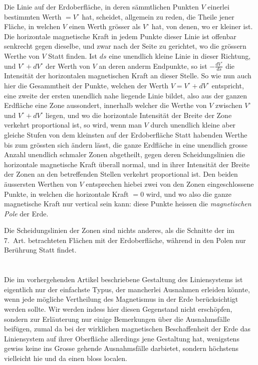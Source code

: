 \documentclass[fontsize=11pt,paper=a4,twoside,openany]{scrbook}
\begin{document}
Die Linie auf der Erdoberfläche, in deren sämmtlichen Punkten $V$ einerlei bestimmten Werth $=V^{\circ}$ hat, scheidet, allgemein zu reden, die Theile jener Fläche, in welchen $V$ einen Werth grösser als $V^{\circ}$ hat, von denen, wo er kleiner ist. Die horizontale magnetische Kraft in jedem Punkte dieser Linie ist offenbar senkrecht gegen dieselbe, und zwar nach der Seite zu gerichtet, wo die grössern Werthe von $V$ Statt finden. Ist $ds$ eine unendlich kleine Linie in dieser Richtung, und $V^{\circ}+dV^{\circ}$ der Werth von $V$ an deren anderm Endpunkte, so ist $-\frac{dV^{\circ}}{ds}$ die Intensität der horizontalen magnetischen Kraft an dieser Stelle. So wie nun auch hier die Gesammtheit der Punkte, welchen der Werth $V=V^{\circ}+dV^{\circ}$ entspricht, eine zweite der ersten unendlich nahe liegende Linie bildet, also aus der ganzen Erdfläche eine Zone aussondert, innerhalb welcher die Werthe von $V$ zwischen $V^{\circ}$ und $V^{\circ}+dV^{\circ}$ liegen, und wo die horizontale Intensität der Breite der Zone verkehrt proportional ist, so wird, wenn man $V$ durch unendlich kleine aber gleiche Stufen von dem kleinsten auf der Erdoberfläche Statt habenden Werthe bis zum grössten sich ändern lässt, die ganze Erdfläche in eine unendlich grosse Anzahl unendlich schmaler Zonen abgetheilt, gegen deren Scheidungslinien die horizontale magnetische Kraft überall normal, und in ihrer Intensität der Breite der Zonen an den betreffenden Stellen verkehrt proportional ist. Den beiden äussersten Werthen von $V$ entsprechen hiebei zwei von den Zonen eingeschlossene Punkte, in welchen die horizontale Kraft $=0$ wird, und wo also die ganze magnetische Kraft nur vertical sein kann: diese Punkte heissen die \textit{magnetischen Pole} der Erde.

Die Scheidungslinien der Zonen sind nichts anderes, als die Schnitte der im 7.~Art. betrachteten Flächen mit der Erdoberfläche, während in den Polen nur Berührung Statt findet.

\section{}

Die im vorhergehenden Artikel beschriebene Gestaltung des Liniensystems ist eigentlich nur der einfachste Typus, der mancherlei Ausnahmen erleiden könnte, wenn jede mögliche Vertheilung des Magnetismus in der Erde berücksichtigt werden sollte. Wir werden indess hier diesen Gegenstand nicht erschöpfen, sondern zur Erläuterung nur einige Bemerkungen über die Ausnahmsfälle beifügen, zumal da bei der wirklichen magnetischen Beschaffenheit der Erde das Liniensystem auf ihrer Oberfläche allerdings jene Gestaltung hat, wenigstens gewiss keine ins Grosse gehende Ausnahmsfälle darbietet, sondern höchstens vielleicht hie und da einen bloss localen.
\end{document}
